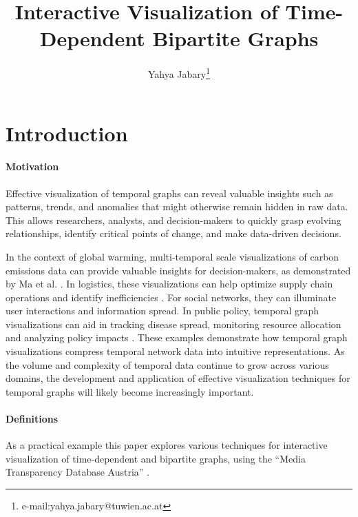 \documentclass{vgtc}
\title{Interactive Visualization of Time-Dependent Bipartite Graphs}
\author{Yahya Jabary\thanks{e-mail:yahya.jabary@tuwien.ac.at}}
\affiliation{\scriptsize TU Wien}
\begin{document}
  
\maketitle


\section{Introduction} %

\paragraph{Motivation} Effective visualization of temporal graphs can reveal valuable insights such as patterns, trends, and anomalies that might otherwise remain hidden in raw data. This allows researchers, analysts, and decision-makers to quickly grasp evolving relationships, identify critical points of change, and make data-driven decisions.

In the context of global warming, multi-temporal scale visualizations of carbon emissions data can provide valuable insights for decision-makers, as demonstrated by Ma et al. \cite{ma2023histgnn}. In logistics, these visualizations can help optimize supply chain operations and identify inefficiencies \cite{Yang2019AnimatedMS} \cite{Tamilmani2019ModellingAA}. For social networks, they can illuminate user interactions and information spread. In public policy, temporal graph visualizations can aid in tracking disease spread, monitoring resource allocation and analyzing policy impacts \cite{chung2023temporal}.
These examples demonstrate how temporal graph visualizations compress temporal network data into intuitive representations. As the volume and complexity of temporal data continue to grow across various domains, the development and application of effective visualization techniques for temporal graphs will likely become increasingly important.

\paragraph{Definitions} As a practical example this paper explores various techniques for interactive visualization of time-dependent and bipartite graphs, using the ``Media Transparency Database Austria'' \cite{dataset}.
\end{document}
